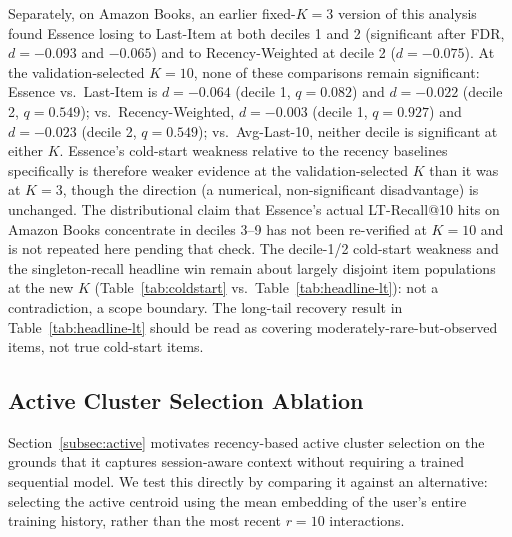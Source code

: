 \documentclass[11pt,a4paper]{article}
\begin{document}
Separately, on Amazon Books, an earlier fixed-$K=3$ version of this
analysis found Essence losing to Last-Item at both deciles 1 and 2
(significant after FDR, $d=-0.093$ and $-0.065$) and to Recency-Weighted
at decile 2 ($d=-0.075$). At the validation-selected $K=10$, none of these
comparisons remain significant: Essence vs.\ Last-Item is $d=-0.064$
(decile 1, $q=0.082$) and $d=-0.022$ (decile 2, $q=0.549$); vs.\
Recency-Weighted, $d=-0.003$ (decile 1, $q=0.927$) and $d=-0.023$
(decile 2, $q=0.549$); vs.\ Avg-Last-10, neither decile is significant at
either $K$. Essence's cold-start weakness relative to the recency
baselines specifically is therefore weaker evidence at the
validation-selected $K$ than it was at $K=3$, though the direction (a
numerical, non-significant disadvantage) is unchanged. The distributional
claim that Essence's actual LT-Recall@10 hits on Amazon Books concentrate
in deciles 3--9 has not been re-verified at $K=10$ and is not repeated
here pending that check. The decile-1/2 cold-start weakness and the
singleton-recall headline win remain about largely disjoint item
populations at the new $K$ (Table~\ref{tab:coldstart} vs.\
Table~\ref{tab:headline-lt}): not a contradiction, a scope boundary. The
long-tail recovery result in Table~\ref{tab:headline-lt} should be read as
covering moderately-rare-but-observed items, not true cold-start items.

\subsection{Active Cluster Selection Ablation}
\label{sec:ablation}

Section~\ref{subsec:active} motivates recency-based active cluster selection
on the grounds that it captures session-aware context without requiring a
trained sequential model. We test this directly by comparing it against an
alternative: selecting the active centroid using the mean embedding of the
user's entire training history, rather than the most recent $r=10$
interactions.
\end{document}

